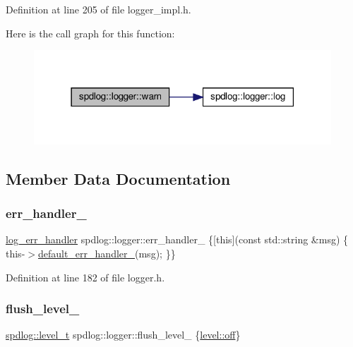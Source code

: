 Definition at line 205 of file logger\+\_\+impl.\+h.

Here is the call graph for this function\+:
\nopagebreak
\begin{figure}[H]
\begin{center}
\leavevmode
\includegraphics[width=316pt]{classspdlog_1_1logger_af9153fa3a0735a535ea56f684dc53256_cgraph}
\end{center}
\end{figure}


\subsection{Member Data Documentation}
\mbox{\label{classspdlog_1_1logger_a3e623bd54bd38315f66063ae8907ce17}} 
\subsubsection{\texorpdfstring{err\+\_\+handler\+\_\+}{err\_handler\_}}
{\footnotesize\ttfamily \hyperlink{namespacespdlog_ad3ed787a29f245c833ef66faf48036e2}{log\+\_\+err\+\_\+handler} spdlog\+::logger\+::err\+\_\+handler\+\_\+ \{\mbox{[}this\mbox{]}(const std\+::string \&msg) \{ this-\/$>$\hyperlink{classspdlog_1_1logger_a3432e21bdc19d74024b57cc3f26a8471}{default\+\_\+err\+\_\+handler\+\_\+}(msg); \}\}\hspace{0.3cm}{\ttfamily [protected]}}



Definition at line 182 of file logger.\+h.

\mbox{\label{classspdlog_1_1logger_a69f7cbb7e1b2d5204a409906a62c1e94}} 
\subsubsection{\texorpdfstring{flush\+\_\+level\+\_\+}{flush\_level\_}}
{\footnotesize\ttfamily \hyperlink{namespacespdlog_a8585bf495310a6ce695191739351709b}{spdlog\+::level\+\_\+t} spdlog\+::logger\+::flush\+\_\+level\+\_\+ \{\hyperlink{namespacespdlog_1_1level_a35f5227e5daf228d28a207b7b2aefc8ba917591d8c0e89f6e6247c95c67809a1a}{level\+::off}\}\hspace{0.3cm}{\ttfamily [protected]}}



